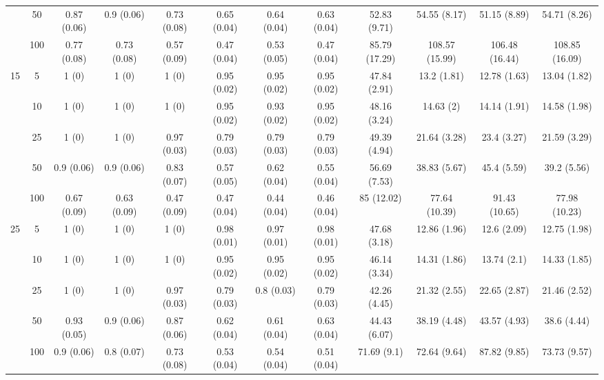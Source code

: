 \documentclass[10pt]{article}
\theoremstyle{definition}
\begin{document}
\begin{table}[H]
\begin{center}
{\begin{tabular}{cc|ccc|ccc|cccc|}
  & 50  & 0.87 (0.06) & 0.9 (0.06) & 0.73 (0.08) & 0.65 (0.04) & 0.64 (0.04) & 0.63 (0.04) & 52.83 (9.71) & 54.55 (8.17) & 51.15 (8.89) & 54.71 (8.26) \\ 
  & 100  & 0.77 (0.08) & 0.73 (0.08) & 0.57 (0.09) & 0.47 (0.04) & 0.53 (0.05) & 0.47 (0.04) & 85.79 (17.29) & 108.57 (15.99) & 106.48 (16.44) & 108.85 (16.09) \\[.3cm] 
 \multirow{5}{*}{15} & 5  & 1 (0) & 1 (0) & 1 (0) & 0.95 (0.02) & 0.95 (0.02) & 0.95 (0.02) & 47.84 (2.91) & 13.2 (1.81) & 12.78 (1.63) & 13.04 (1.82) \\ 
  & 10  & 1 (0) & 1 (0) & 1 (0) & 0.95 (0.02) & 0.93 (0.02) & 0.95 (0.02) & 48.16 (3.24) & 14.63 (2) & 14.14 (1.91) & 14.58 (1.98) \\ 
  & 25  & 1 (0) & 1 (0) & 0.97 (0.03) & 0.79 (0.03) & 0.79 (0.03) & 0.79 (0.03) & 49.39 (4.94) & 21.64 (3.28) & 23.4 (3.27) & 21.59 (3.29) \\ 
  & 50  & 0.9 (0.06) & 0.9 (0.06) & 0.83 (0.07) & 0.57 (0.05) & 0.62 (0.04) & 0.55 (0.04) & 56.69 (7.53) & 38.83 (5.67) & 45.4 (5.59) & 39.2 (5.56) \\ 
  & 100  & 0.67 (0.09) & 0.63 (0.09) & 0.47 (0.09) & 0.47 (0.04) & 0.44 (0.04) & 0.46 (0.04) & 85 (12.02) & 77.64 (10.39) & 91.43 (10.65) & 77.98 (10.23) \\[.3cm] 
 \multirow{5}{*}{25} & 5  & 1 (0) & 1 (0) & 1 (0) & 0.98 (0.01) & 0.97 (0.01) & 0.98 (0.01) & 47.68 (3.18) & 12.86 (1.96) & 12.6 (2.09) & 12.75 (1.98) \\ 
  & 10  & 1 (0) & 1 (0) & 1 (0) & 0.95 (0.02) & 0.95 (0.02) & 0.95 (0.02) & 46.14 (3.34) & 14.31 (1.86) & 13.74 (2.1) & 14.33 (1.85) \\ 
  & 25  & 1 (0) & 1 (0) & 0.97 (0.03) & 0.79 (0.03) & 0.8 (0.03) & 0.79 (0.03) & 42.26 (4.45) & 21.32 (2.55) & 22.65 (2.87) & 21.46 (2.52) \\ 
  & 50  & 0.93 (0.05) & 0.9 (0.06) & 0.87 (0.06) & 0.62 (0.04) & 0.61 (0.04) & 0.63 (0.04) & 44.43 (6.07) & 38.19 (4.48) & 43.57 (4.93) & 38.6 (4.44) \\ 
  & 100  & 0.9 (0.06) & 0.8 (0.07) & 0.73 (0.08) & 0.53 (0.04) & 0.54 (0.04) & 0.51 (0.04) & 71.69 (9.1) & 72.64 (9.64) & 87.82 (9.85) & 73.73 (9.57) \\  
\end{tabular}}
   \end{center}
      \vspace{-.5cm}
\end{table}
\end{document}

